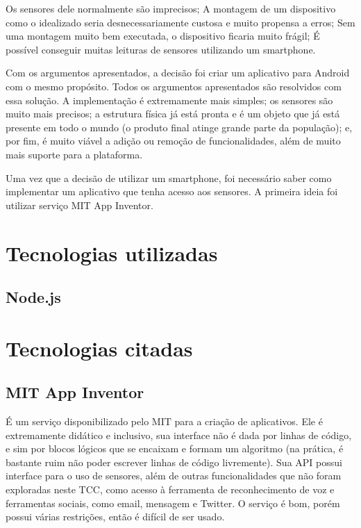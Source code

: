 \documentclass[a4paper,12pt]{article}
\begin{document}
Os sensores dele normalmente são imprecisos;
A montagem de um dispositivo como o idealizado seria desnecessariamente custosa e muito propensa a erros;
Sem uma montagem muito bem executada, o dispositivo ficaria muito frágil;
É possível conseguir muitas leituras de sensores utilizando um smartphone.


Com os argumentos apresentados, a decisão foi criar um aplicativo para Android com o mesmo propósito. Todos os argumentos apresentados são resolvidos com essa solução. A implementação é extremamente mais simples; os sensores são muito mais precisos; a estrutura física já está pronta e é um objeto que já está presente em todo o mundo (o produto final atinge grande parte da população); e, por fim, é muito viável a adição ou remoção de funcionalidades, além de muito mais suporte para a plataforma.


Uma vez que a decisão de utilizar um smartphone, foi necessário saber como implementar um aplicativo que tenha acesso aos sensores.
A primeira ideia foi utilizar serviço MIT App Inventor.







\section{Tecnologias utilizadas}

\subsection{Node.js}





\section{Tecnologias citadas}





\subsection{MIT App Inventor}

É um serviço disponibilizado pelo MIT para a criação de aplicativos. Ele é extremamente didático e inclusivo, sua interface não é dada por linhas de código, e sim por blocos lógicos que se encaixam e formam um algoritmo (na prática, é bastante ruim não poder escrever linhas de código livremente). Sua API possui interface para o uso de sensores, além de outras funcionalidades que não foram exploradas neste TCC, como acesso à ferramenta de reconhecimento de voz e ferramentas sociais, como email, mensagem e Twitter. O serviço é bom, porém possui várias restrições, então é difícil de ser usado.
\end{document}
